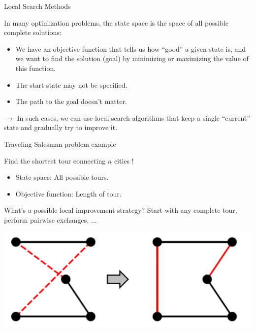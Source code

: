 \documentclass[9pt]{beamer}
\begin{document}
\begin{frame}{Local Search Methods}
\begin{small}

In many optimization problems, the state space is the space of all possible complete solutions:
\begin{itemize}
    \item We have an objective function that tells us how “good” a given state is, and we want to find the solution (goal) by minimizing or maximizing the value of this function.
    \item The start state may not be specified.
    \item The path to the goal doesn’t matter.
\end{itemize}

$\rightarrow$ In such cases, we can use \textcolor{CS-1}{local search algorithms} that keep a single “current” state and gradually try to improve it.

\end{small}
\end{frame}

\begin{frame}{Traveling Salesman problem example}
\begin{small}

Find the shortest tour connecting $n$ cities !

\begin{itemize}
    \item State space: All possible tours.
    \item Objective function: Length of tour.
\end{itemize}

What’s a possible local improvement strategy? Start with any complete tour, perform pairwise exchanges, ...

\begin{center}
    \includegraphics[keepaspectratio, width=0.75\linewidth]{images/salesman_problem.png}
\end{center}
\end{small}
\end{frame}
\end{document}
